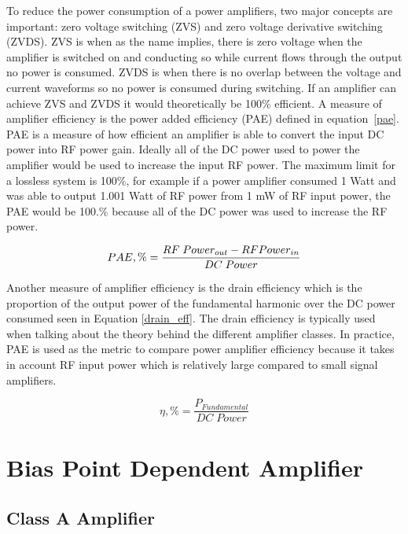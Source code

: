 To reduce the power consumption of a power amplifiers, two major concepts are important: zero voltage switching (ZVS) and zero voltage derivative switching (ZVDS). ZVS is when as the name implies, there is zero voltage when the amplifier is switched on and conducting so while current flows through the output no power is consumed. ZVDS is when there is no overlap between the voltage and current waveforms so no power is consumed during switching. If an amplifier can achieve ZVS and ZVDS it would theoretically be 100\% efficient. A measure of amplifier efficiency is the power added efficiency (PAE) defined in equation~\ref{pae}. PAE is a measure of how efficient an amplifier is able to convert the input DC power into RF power gain. Ideally all of the DC power used to power the amplifier would be used to increase the input RF power. The maximum limit for a lossless system is 100\%, for example if a power amplifier consumed 1 Watt and was able to output 1.001 Watt of RF power from 1 mW of RF input power, the PAE would be 100.\% because all of the DC power was used to increase the RF power.

\begin{equation}\label{pae}
  PAE,\% = \frac{RF\;Power_{out} - RF\\Power_{in}}{DC\;Power}
\end{equation}

Another measure of amplifier efficiency is the drain efficiency which is the proportion of the output power of the fundamental harmonic over the DC power consumed seen in Equation \ref{drain_eff}. The drain efficiency is typically used when talking about the theory behind the different amplifier classes. In practice, PAE is used as the metric to compare power amplifier efficiency because it takes in account RF input power which is relatively large compared to small signal amplifiers.

\begin{equation}\label{drain_eff}
  \eta, \% = \frac{P_{Fundamental}}{DC\;Power}
\end{equation}

\section{Bias Point Dependent Amplifier}

\subsection{Class A Amplifier}

